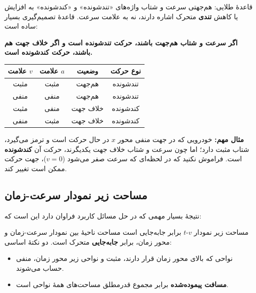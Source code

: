 \documentclass[12pt, a4paper]{article}
\begin{document}
\begin{tipbox}{قاعدهٔ طلایی: هم‌جهتی سرعت و شتاب}
واژه‌های «تندشونده» و «کندشونده» به افزایش یا کاهش \textbf{تندی} متحرک اشاره دارند، نه به علامت سرعت. قاعدهٔ تصمیم‌گیری بسیار ساده است:
\begin{center}
\textbf{اگر سرعت و شتاب هم‌جهت باشند، حرکت تندشونده است و اگر خلاف جهت هم باشند، حرکت کندشونده است.}
\end{center}
\begin{center}
\begin{tabular}{c c c c}
\toprule
\textbf{علامت $v$} & \textbf{علامت $a$} & \textbf{وضعیت} & \textbf{نوع حرکت} \\
\midrule
مثبت & مثبت & هم‌جهت & تندشونده \\
منفی & منفی & هم‌جهت & تندشونده \\
مثبت & منفی & خلاف جهت & کندشونده \\
منفی & مثبت & خلاف جهت & کندشونده \\
\bottomrule
\end{tabular}
\end{center}
\textbf{مثال مهم:} خودرویی که در جهت منفی محور $x$ در حال حرکت است و ترمز می‌گیرد، شتاب مثبت دارد؛ اما چون سرعت و شتاب خلاف جهت یکدیگرند، حرکت آن \textbf{کندشونده} است. فراموش نکنید که در لحظه‌ای که سرعت صفر می‌شود ($v=0$)، جهت حرکت ممکن است تغییر کند.
\end{tipbox}

\subsection{مساحت زیر نمودار سرعت-زمان}

نتیجهٔ بسیار مهمی که در حل مسائل کاربرد فراوان دارد این است که:

\begin{conceptbox}{مساحت زیر نمودار $v$-$t$ برابر جابه‌جایی است}
مساحت ناحیهٔ بین نمودار سرعت-زمان و محور زمان، برابر \textbf{جابه‌جایی} متحرک است. دو نکتهٔ اساسی:
\begin{itemize}
    \item نواحی که بالای محور زمان قرار دارند، مثبت و نواحی زیر محور زمان، منفی حساب می‌شوند.
    \item \textbf{مسافت پیموده‌شده} برابر مجموع قدرمطلق مساحت‌های همهٔ نواحی است.
\end{itemize}
\end{conceptbox}
\end{document}

